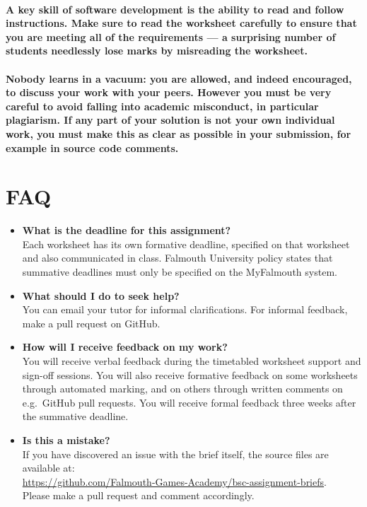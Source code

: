 \documentclass{../../fal_assignment}
\begin{document}
\paragraph{A key skill of software development is the ability to read and follow instructions.
Make sure to read the worksheet carefully to ensure that you are meeting all of the requirements ---
a surprising number of students needlessly lose marks by misreading the worksheet.}

\paragraph{Nobody learns in a vacuum: you are allowed, and indeed encouraged, to discuss your work with your peers. However you must be very careful to avoid falling into \textbf{academic misconduct}, in particular \textbf{plagiarism}. If any part of your solution is \textbf{not your own individual work}, you must make this as clear as possible in your submission, for example in source code comments.}

\section*{FAQ}

\begin{itemize}
	\item 	\textbf{What is the deadline for this assignment?} \\ 
			Each worksheet has its own formative deadline, specified on that worksheet and also communicated in class.
    		Falmouth University policy states that summative deadlines must only be specified on the MyFalmouth system.
    		
	\item 	\textbf{What should I do to seek help?} \\ 
    		You can email your tutor for informal clarifications. For informal feedback, make a pull request on GitHub. 
    		
	\item 	\textbf{How will I receive feedback on my work?} \\ 
			You will receive verbal feedback during the timetabled worksheet support and sign-off sessions.
			You will also receive formative feedback on some worksheets through automated marking,
			and on others through written comments on e.g.\ GitHub pull requests.
			You will receive formal feedback three weeks after the summative deadline.
    		
    	\item 	\textbf{Is this a mistake?} \\ 	
    		If you have discovered an issue with the brief itself, the source files are available at: \\
    		\url{https://github.com/Falmouth-Games-Academy/bsc-assignment-briefs}.\\
    		 Please make a pull request and comment accordingly.
\end{itemize}
\end{document}

